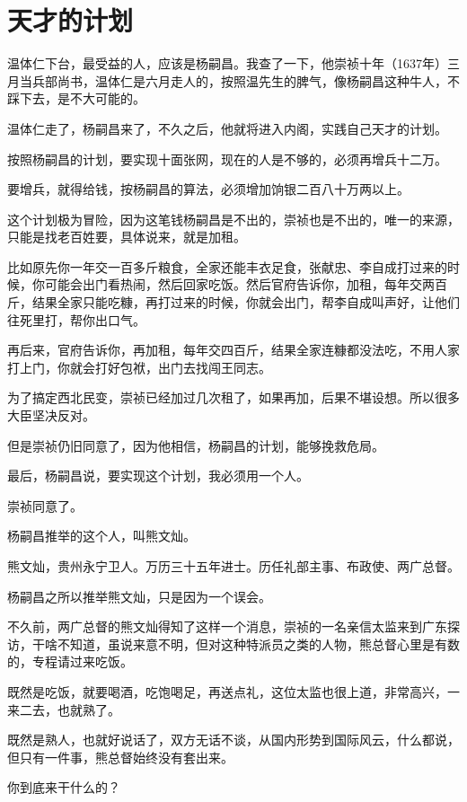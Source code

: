 \section{天才的计划}
\ifnum{}
	\begin{multicols}{\theparacolNo}
		\fi
		温体仁下台，最受益的人，应该是杨嗣昌。我查了一下，他崇祯十年（1637年）三月当兵部尚书，温体仁是六月走人的，按照温先生的脾气，像杨嗣昌这种牛人，不踩下去，是不大可能的。

		温体仁走了，杨嗣昌来了，不久之后，他就将进入内阁，实践自己天才的计划。

		按照杨嗣昌的计划，要实现十面张网，现在的人是不够的，必须再增兵十二万。

		要增兵，就得给钱，按杨嗣昌的算法，必须增加饷银二百八十万两以上。

		这个计划极为冒险，因为这笔钱杨嗣昌是不出的，崇祯也是不出的，唯一的来源，只能是找老百姓要，具体说来，就是加租。

		比如原先你一年交一百多斤粮食，全家还能丰衣足食，张献忠、李自成打过来的时候，你可能会出门看热闹，然后回家吃饭。然后官府告诉你，加租，每年交两百斤，结果全家只能吃糠，再打过来的时候，你就会出门，帮李自成叫声好，让他们往死里打，帮你出口气。

		再后来，官府告诉你，再加租，每年交四百斤，结果全家连糠都没法吃，不用人家打上门，你就会打好包袱，出门去找闯王同志。

		为了搞定西北民变，崇祯已经加过几次租了，如果再加，后果不堪设想。所以很多大臣坚决反对。

		但是崇祯仍旧同意了，因为他相信，杨嗣昌的计划，能够挽救危局。

		最后，杨嗣昌说，要实现这个计划，我必须用一个人。

		崇祯同意了。

		杨嗣昌推举的这个人，叫熊文灿。

		熊文灿，贵州永宁卫人。万历三十五年进士。历任礼部主事、布政使、两广总督。

		杨嗣昌之所以推举熊文灿，只是因为一个误会。

		不久前，两广总督的熊文灿得知了这样一个消息，崇祯的一名亲信太监来到广东探访，干啥不知道，虽说来意不明，但对这种特派员之类的人物，熊总督心里是有数的，专程请过来吃饭。

		既然是吃饭，就要喝酒，吃饱喝足，再送点礼，这位太监也很上道，非常高兴，一来二去，也就熟了。

		既然是熟人，也就好说话了，双方无话不谈，从国内形势到国际风云，什么都说，但只有一件事，熊总督始终没有套出来。

		你到底来干什么的？


\end{multicols}

